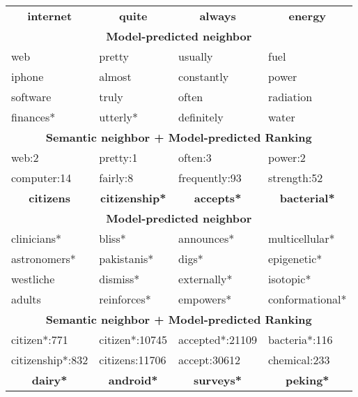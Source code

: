 \documentclass{article}
\begin{document}
\begin{table}[!ht]
\begin{center}
		\begin{tabular}{|p{2.5cm}|p{2.5cm}||p{2.5cm}|p{2.5cm}|}
           \toprule
			\multicolumn{1}{|c|}{\bf internet} & \multicolumn{1}{|c|}{\bf quite} & 			\multicolumn{1}{c|}{\bf always} & \multicolumn{1}{c|}{\bf energy}\\
  			\cline{1-4}
           \multicolumn{4}{|c|}{\bf Model-predicted neighbor} \\
           \cline{1-4}
            web  & pretty & usually & fuel\\
            iphone & almost & constantly & power\\
            software & truly & often & radiation \\
            finances* & utterly* &definitely & water\\
           \cline{1-4}
		   \multicolumn{4}{|c|}{\bf Semantic neighbor + Model-predicted Ranking}\\
           \cline{1-4}
			web:2 & pretty:1 & often:3 & power:2\\
            computer:14 & fairly:8 & frequently:93 & strength:52\\
            \bottomrule
            \toprule
			\multicolumn{1}{|c|}{\bf citizens} & \multicolumn{1}{|c|}{\bf citizenship*} & \multicolumn{1}{c|}{\bf accepts*} & \multicolumn{1}{c|}{\bf bacterial*}\\
           \cline{1-4}
           \multicolumn{4}{|c|}{\bf Model-predicted neighbor} \\
           \cline{1-4}
            clinicians* & bliss* & announces*& multicellular* \\
            astronomers* &  pakistanis* & digs* & epigenetic* \\
            westliche & dismiss* & externally* & isotopic*  \\
            adults & reinforces* & empowers*  & \small conformational*\\
           \cline{1-4}
		   \multicolumn{4}{|c|}{\bf Semantic neighbor + Model-predicted Ranking}\\
           \cline{1-4}
			citizen*:771 & citizen*:10745 & accepted*:21109 & bacteria*:116\\
            citizenship*:832 & citizens:11706 & accept:30612 & chemical:233\\
           \bottomrule
           \toprule
			\multicolumn{1}{|c|}{\bf dairy*} & \multicolumn{1}{|c|}{\bf android*} & 			\multicolumn{1}{c|}{\bf surveys*} & \multicolumn{1}{c|}{\bf peking*}\\

\end{tabular}
\end{center}
\end{table}
\end{document}
